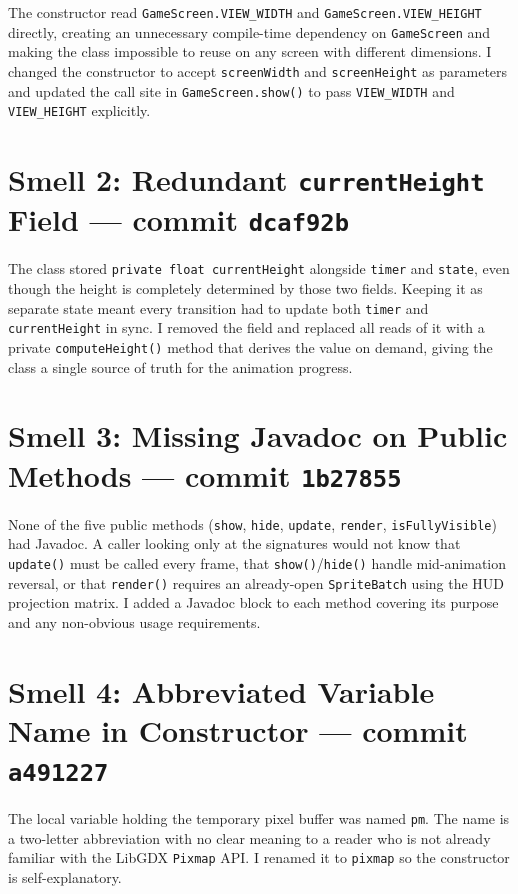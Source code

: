 \documentclass[10pt]{article}
\begin{document}
The constructor read \texttt{GameScreen.VIEW\_WIDTH} and
\texttt{GameScreen.VIEW\_HEIGHT} directly, creating an unnecessary compile-time
dependency on \texttt{GameScreen} and making the class impossible to reuse on
any screen with different dimensions. I changed the constructor to accept
\texttt{screenWidth} and \texttt{screenHeight} as parameters and updated the
call site in \texttt{GameScreen.show()} to pass \texttt{VIEW\_WIDTH} and
\texttt{VIEW\_HEIGHT} explicitly.

\section{Smell 2: Redundant \texttt{currentHeight} Field \normalfont\small — commit \texttt{dcaf92b}}

The class stored \texttt{private float currentHeight} alongside
\texttt{timer} and \texttt{state}, even though the height is completely
determined by those two fields. Keeping it as separate state meant every
transition had to update both \texttt{timer} and \texttt{currentHeight} in
sync. I removed the field and replaced all reads of it with a private
\texttt{computeHeight()} method that derives the value on demand, giving the
class a single source of truth for the animation progress.

\section{Smell 3: Missing Javadoc on Public Methods \normalfont\small — commit \texttt{1b27855}}

None of the five public methods (\texttt{show}, \texttt{hide}, \texttt{update},
\texttt{render}, \texttt{isFullyVisible}) had Javadoc. A caller looking only at
the signatures would not know that \texttt{update()} must be called every frame,
that \texttt{show()}/\texttt{hide()} handle mid-animation reversal, or that
\texttt{render()} requires an already-open \texttt{SpriteBatch} using the HUD
projection matrix. I added a Javadoc block to each method covering its purpose
and any non-obvious usage requirements.

\section{Smell 4: Abbreviated Variable Name in Constructor \normalfont\small — commit \texttt{a491227}}

The local variable holding the temporary pixel buffer was named \texttt{pm}.
The name is a two-letter abbreviation with no clear meaning to a reader who is
not already familiar with the LibGDX \texttt{Pixmap} API. I renamed it to
\texttt{pixmap} so the constructor is self-explanatory.
\end{document}
